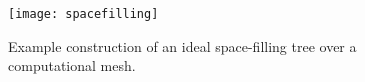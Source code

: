\begin{figure}[t]
\begin{center}
\texttt{[image: spacefilling]}
\caption{
Example construction of an ideal space-filling tree over a computational mesh.
}
\label{fig:spacefilling}
\end{center}
\end{figure}
